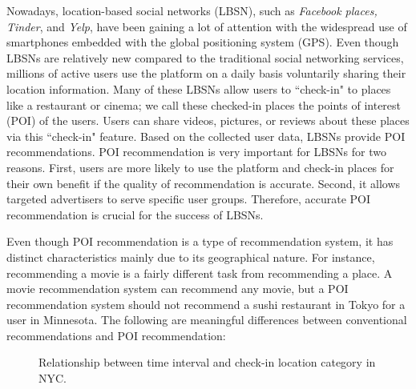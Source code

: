 \documentclass{sig-alternate}
\begin{document}
Nowadays, location-based social networks (LBSN), such as \emph{Facebook places, Tinder},  and \emph{Yelp}, 
have been gaining a lot of attention with the widespread use of smartphones embedded with the 
global positioning system (GPS). Even though LBSNs are relatively new compared to 
the traditional social networking services, millions of active users use the platform on a daily basis voluntarily sharing 
their location information. Many of these LBSNs allow users to ``check-in" to
places like a restaurant or cinema; we call these checked-in places the points of interest (POI) 
of the users. Users can share videos, pictures, or reviews about these places via this ``check-in" 
feature. Based on the collected user data, LBSNs provide POI recommendations. POI recommendation 
is very important for LBSNs for two reasons. First, users are more likely to use the platform and check-in places 
for their own benefit if the quality of recommendation is accurate. 
Second, it allows targeted advertisers to serve specific user groups. Therefore, 
accurate POI recommendation is crucial for the success of LBSNs. \cite{Cheng:2013}

Even though POI recommendation is a type of recommendation system, it has distinct characteristics 
mainly due to its geographical nature. For instance, recommending a movie is a fairly different task from 
recommending a place. A movie recommendation system can recommend any movie, but a POI recommendation 
system should not recommend a sushi restaurant in Tokyo for a user in Minnesota. The following are 
meaningful differences between conventional recommendations and POI recommendation:

\begin{figure}
\centering
{}
\caption{Relationship between time interval and check-in location category in NYC. \cite{Li:2017}}
\label{fig:NYC_checkIn}
\end{figure}
\end{document}
